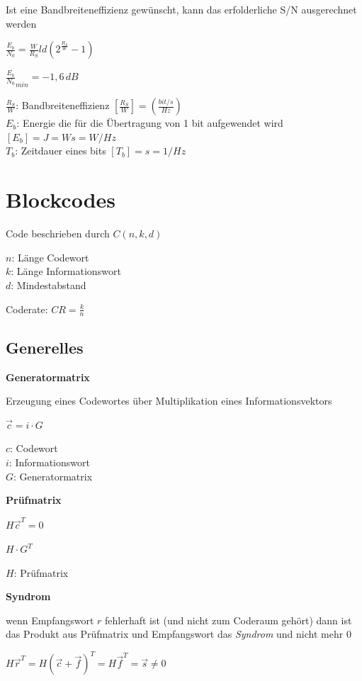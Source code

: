 Ist eine Bandbreiteneffizienz gewünscht, kann das erfolderliche S/N ausgerechnet werden

$\displaystyle{
    \frac{E_b}{N_0} = \frac{W}{R_S} ld \left( 2^{\frac{R_S}{W}} - 1 \right)
}$

$\displaystyle{
    \frac{E_b}{N_0}_{min} = -1,6\,dB
}$

$\frac{R_S}{W}$: Bandbreiteneffizienz $[\frac{R_S}{W}] = \left(\frac{bit/s}{Hz}\right)$\\
$E_b$: Energie die für die Übertragung von 1 bit aufgewendet wird $[E_b] = J = Ws = W/Hz$\\
$T_b$: Zeitdauer eines bits $[T_b] = s = 1/Hz$

\section{Blockcodes}

Code beschrieben durch $C(n, k, d)$

$n$: Länge Codewort\\
$k$: Länge Informationswort\\
$d$: Mindestabstand

Coderate: 
$\displaystyle{
    CR = \frac{k}{n}
}$

\subsection{Generelles}

\textbf{Generatormatrix}

Erzeugung eines Codewortes über Multiplikation eines Informationsvektors

$\displaystyle{
    \vec{c} = i \cdot G
}$

$c$: Codewort\\
$i$: Informationswort\\
$G$: Generatormatrix

\textbf{Prüfmatrix}

$\displaystyle{
    H \vec{c}^T = 0
}$

$\displaystyle{
    H \cdot G^T
}$

$H$: Prüfmatrix

\textbf{Syndrom}

wenn Empfangswort $r$ fehlerhaft ist (und nicht zum Coderaum gehört) dann ist das Produkt aus
Prüfmatrix und Empfangswort das \textit{Syndrom} und nicht mehr 0

$\displaystyle{
    H \vec{r}^T = H (\vec{c} + \vec{f})^T = H \vec{f}^T = \vec{s} \neq 0
}$

